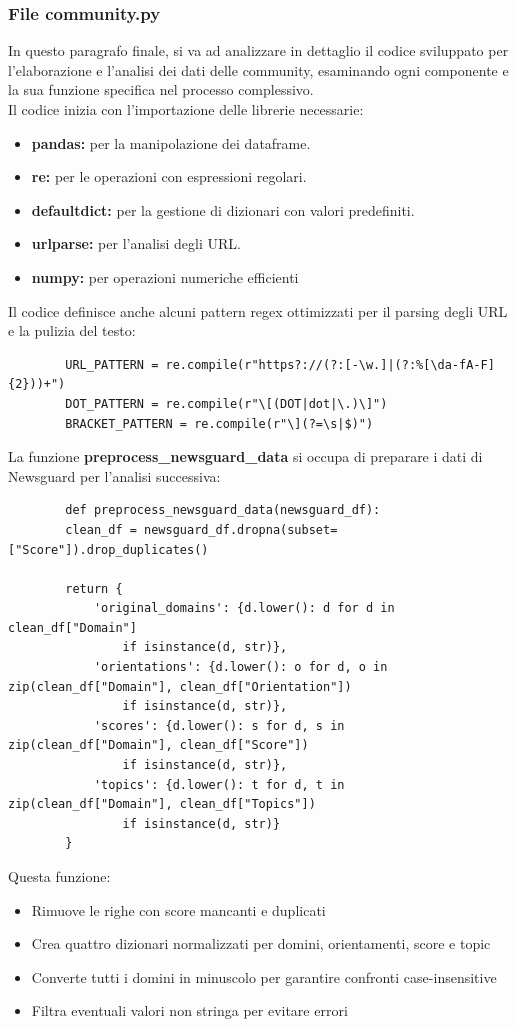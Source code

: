 \documentclass[12pt]{article}
\begin{document}
	\subsubsection{File community.py}
	In questo paragrafo finale, si va ad analizzare in dettaglio il codice sviluppato per l'elaborazione e l'analisi dei dati delle community, esaminando ogni componente e la sua funzione specifica nel processo complessivo.\\
	Il codice inizia con l'importazione delle librerie necessarie:
	\begin{itemize}[label=]
		\item\textbf{ pandas:} per la manipolazione dei dataframe.
		\item \textbf{re:} per le operazioni con espressioni regolari.
		\item \textbf{defaultdict:} per la gestione di dizionari con valori predefiniti.
		\item \textbf{urlparse:} per l'analisi degli URL.
		\item \textbf{numpy:} per operazioni numeriche efficienti
	\end{itemize}
	Il codice definisce anche alcuni pattern regex ottimizzati per il parsing degli URL e la pulizia del testo:
	\begin{lstlisting}
		URL_PATTERN = re.compile(r"https?://(?:[-\w.]|(?:%[\da-fA-F]{2}))+")
		DOT_PATTERN = re.compile(r"\[(DOT|dot|\.)\]")
		BRACKET_PATTERN = re.compile(r"\](?=\s|$)")
	\end{lstlisting}
	La funzione \textbf{preprocess\_newsguard\_data} si occupa di preparare i dati di Newsguard per l'analisi successiva:
	\begin{lstlisting}
		def preprocess_newsguard_data(newsguard_df):
		clean_df = newsguard_df.dropna(subset=["Score"]).drop_duplicates()
		
		return {
			'original_domains': {d.lower(): d for d in clean_df["Domain"] 
				if isinstance(d, str)},
			'orientations': {d.lower(): o for d, o in zip(clean_df["Domain"], clean_df["Orientation"]) 
				if isinstance(d, str)},
			'scores': {d.lower(): s for d, s in zip(clean_df["Domain"], clean_df["Score"])
				if isinstance(d, str)},
			'topics': {d.lower(): t for d, t in zip(clean_df["Domain"], clean_df["Topics"]) 
				if isinstance(d, str)}
		}
	\end{lstlisting}
	Questa funzione:
	\begin{itemize}[label=]
		\item Rimuove le righe con score mancanti e duplicati
		\item Crea quattro dizionari normalizzati per domini, orientamenti, score e topic
		\item Converte tutti i domini in minuscolo per garantire confronti case-insensitive
		\item Filtra eventuali valori non stringa per evitare errori
	\end{itemize}
\end{document}
